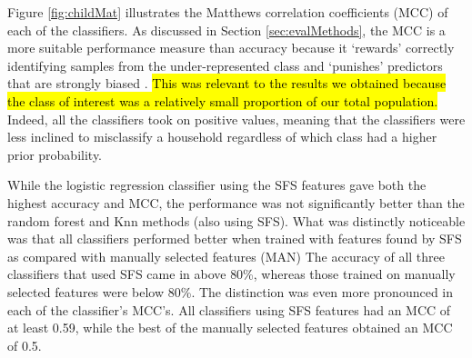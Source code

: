 Figure \ref{fig:childMat} illustrates the Matthews correlation coefficients (MCC) of each of the classifiers.  As discussed in Section \ref{sec:evalMethods}, the MCC is a more suitable performance measure than accuracy because it `rewards' correctly identifying samples from the under-represented class and `punishes' predictors that are strongly biased \cite{Beckel_3}.  \hl{This was relevant to the results we obtained because the class of interest was a relatively small proportion of our total population.}  Indeed, all the classifiers took on positive values, meaning that the classifiers were less inclined to misclassify a household regardless of which class had a higher prior probability. 

While the logistic regression classifier using the SFS features gave both the highest accuracy and MCC, the performance was not significantly better than the random forest and Knn methods (also using SFS). What was distinctly noticeable was that all classifiers performed better when trained with features found by SFS as compared with manually selected features (MAN)  The accuracy of all three classifiers that used SFS came in above 80\%, whereas those trained on manually selected features were below 80\%. The distinction was even more pronounced in each of the classifier's MCC's.  All classifiers using SFS features had an MCC of at least 0.59, while the best of the manually selected features obtained an MCC of 0.5.  %

